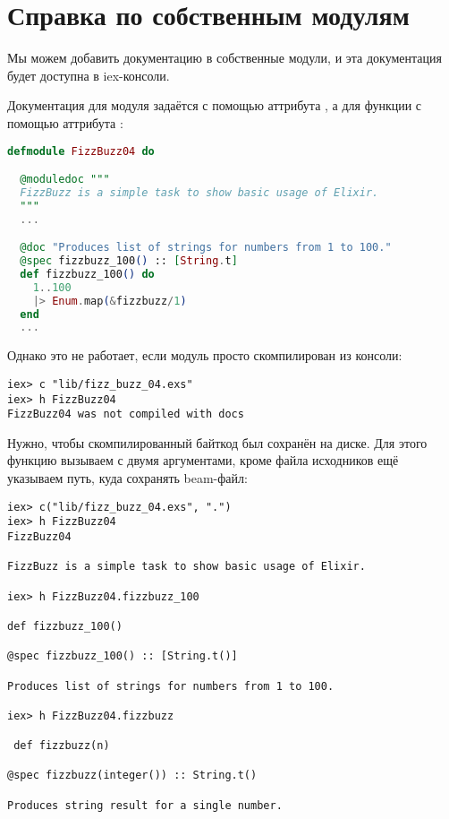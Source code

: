 \section{Справка по собственным модулям}

Мы можем добавить документацию в собственные модули, и эта документация будет доступна в iex-консоли.

Документация для модуля задаётся с помощью аттрибута , а для функции с помощью аттрибута :

\begin{lstlisting}[language=Elixir, style=elixir]
defmodule FizzBuzz04 do

  @moduledoc """
  FizzBuzz is a simple task to show basic usage of Elixir.
  """
  ...

  @doc "Produces list of strings for numbers from 1 to 100."
  @spec fizzbuzz_100() :: [String.t]
  def fizzbuzz_100() do
    1..100
    |> Enum.map(&fizzbuzz/1)
  end
  ...
\end{lstlisting}
Однако это не работает, если модуль просто скомпилирован из консоли:

\begin{lstlisting}[language=ElixirShell, style=elixir-shell]
iex> c "lib/fizz_buzz_04.exs"
iex> h FizzBuzz04
FizzBuzz04 was not compiled with docs
\end{lstlisting}

Нужно, чтобы скомпилированный байткод был сохранён на диске. Для этого функцию  вызываем с двумя аргументами, кроме файла исходников ещё указываем путь, куда сохранять beam-файл:

\begin{lstlisting}[language=ElixirShell, style=elixir-shell]
iex> c("lib/fizz_buzz_04.exs", ".")
iex> h FizzBuzz04
FizzBuzz04

FizzBuzz is a simple task to show basic usage of Elixir.

iex> h FizzBuzz04.fizzbuzz_100

def fizzbuzz_100()

@spec fizzbuzz_100() :: [String.t()]

Produces list of strings for numbers from 1 to 100.

iex> h FizzBuzz04.fizzbuzz

 def fizzbuzz(n)

@spec fizzbuzz(integer()) :: String.t()

Produces string result for a single number.
\end{lstlisting}

